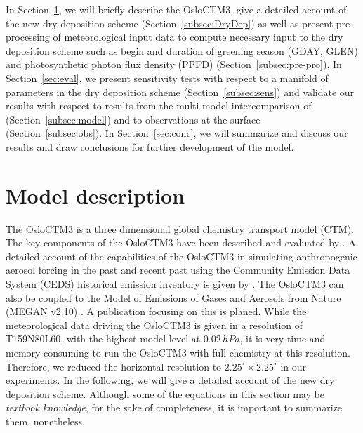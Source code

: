 \documentclass[gmd, manuscript]{copernicus}
\begin{document}
In Section~\ref{sec:model_des}, we will briefly describe the OsloCTM3, give a detailed account of the new dry deposition scheme (Section~\ref{subsec:DryDep}) as well as present pre-processing of meteorological input data to compute necessary input to the dry deposition scheme such as begin and duration of greening season (GDAY, GLEN) and photosynthetic photon flux density (PPFD) (Section~\ref{subsec:pre-pro}). In Section~\ref{sec:eval}, we present sensitivity tests with respect to a manifold of parameters in the dry deposition scheme (Section~\ref{subsec:sens}) and validate our results with respect to results from the multi-model intercomparison of \citet{ACP:Hardacre2015} (Section~\ref{subsec:model}) and to observations at the surface (Section~\ref{subsec:obs}). In Section~\ref{sec:conc}, we will summarize and discuss our results and draw conclusions for further development of the model.
\section{Model description}
\label{sec:model_des}
The OsloCTM3 is a three dimensional global chemistry transport model (CTM). The key components of the OsloCTM3 have been described and evaluated by \citet{GMD:Sovde2012}. A detailed account of the capabilities of the OsloCTM3 in simulating anthropogenic aerosol forcing in the past and recent past using the Community Emission Data System (CEDS) historical emission inventory \citep{GMD:Hoesly2018} is given by \citet{GMD:Lund2018}. The OsloCTM3 can also be coupled to the Model of Emissions of Gases and Aerosols from Nature (MEGAN v2.10) \citep{ACP:Guenther2006}. A publication focusing on this is planed. While the meteorological data driving the OsloCTM3 is given in a resolution of T159N80L60, with the highest model level at $0.02\,\unit{hPa}$, it is very time and memory consuming to run the OsloCTM3 with full chemistry at this resolution. Therefore, we reduced the horizontal resolution to $2.25^\circ\times2.25^\circ$ in our experiments. In the following, we will give a detailed account of the new dry deposition scheme. Although some of the equations in this section may be \emph{textbook knowledge}, for the sake of completeness, it is important to summarize them, nonetheless.
\end{document}
